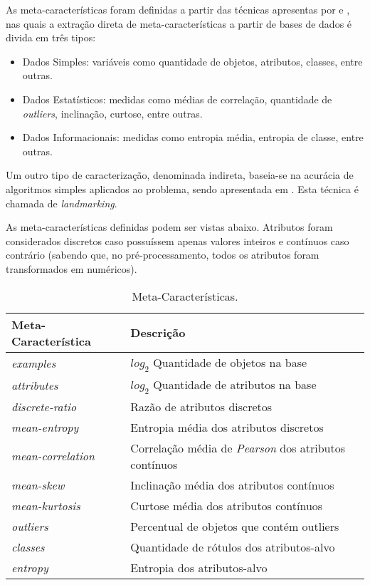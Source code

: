 \documentclass[runningheads]{llncs}
\begin{document}
As meta-características foram definidas a partir das técnicas apresentas por \cite{statlog} e \cite{survey}, nas quais a extração direta de meta-características a partir de bases de dados é divida em três tipos:

\begin{itemize}
    \item Dados Simples: variáveis como quantidade de objetos, atributos, classes, entre outras.
    \item Dados Estatísticos: medidas como médias de correlação, quantidade de \emph{outliers}, inclinação, curtose, entre outras.
    \item Dados Informacionais: medidas como entropia média, entropia de classe, entre outras.
\end{itemize}

Um outro tipo de caracterização, denominada indireta, baseia-se na acurácia de algoritmos simples aplicados ao problema, sendo apresentada em \cite{landmarking}. Esta técnica é chamada de \emph{landmarking}.

As meta-características definidas podem ser vistas abaixo. Atributos foram considerados discretos caso possuíssem apenas valores inteiros e contínuos caso contrário (sabendo que, no pré-processamento, todos os atributos foram transformados em numéricos).

\begin{table}[ht]
\centering
\caption{Meta-Características.}\label{attributes}
\begin{tabular}{|l|l|}
\hline
Meta-Característica & Descrição \\
\hline
\emph{examples} & ${log_2}$ Quantidade de objetos na base \\
\emph{attributes} & ${log_2}$ Quantidade de atributos na base \\
\emph{discrete-ratio} & Razão de atributos discretos \\
\emph{mean-entropy} & Entropia média dos atributos discretos \\
\emph{mean-correlation} & Correlação média de \emph{Pearson} dos atributos contínuos \\
\emph{mean-skew} & Inclinação média dos atributos contínuos \\
\emph{mean-kurtosis} & Curtose média dos atributos contínuos \\
\emph{outliers} & Percentual de objetos que contém outliers \\
\emph{classes} & Quantidade de rótulos dos atributos-alvo \\
\emph{entropy} & Entropia dos atributos-alvo \\
\hline
\end{tabular}
\end{table}
\end{document}

